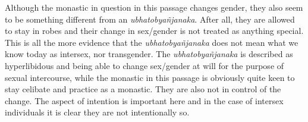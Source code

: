 Although the monastic in question in this passage changes gender, they also seem to be something different from an {\em ubhatob­yañ­janaka}. After all, they are allowed to stay in robes and their change in sex/gender is not treated as anything special. This is all the more evidence that the {\em ubhatob­yañ­janaka} does not mean what we know today as intersex, nor transgender. The {\em ubhatob­yañ­janaka} is described as hyperlibidous and being able to change sex/gender at will for the purpose of sexual intercourse, while the monastic in this passage is obviously quite keen to stay celibate and practice as a monastic. They are also not in control of the change. The aspect of intention is important here and in the case of intersex individuals it is clear they are not intentionally so.

